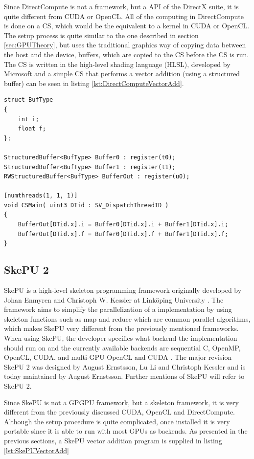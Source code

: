 Since DirectCompute is not a framework, but a API of the DirectX suite, it is quite different from CUDA or OpenCL. All of the computing in DirectCompute is done on a CS, which would be the equivalent to a kernel in CUDA or OpenCL. The setup process is quite similar to the one described in section \ref{sec:GPUTheory}, but uses the traditional graphics way of copying data between the host and the device, buffers, which are copied to the CS before the CS is run. The CS is written in the high-level shading language (HLSL), developed by Microsoft and a simple CS that performs a vector addition (using a structured buffer) can be seen in listing \ref{lst:DirectComputeVectorAdd}.

\begin{lstlisting}[caption={DirectCompute vector addition CS}, label={lst:DirectComputeVectorAdd}, frame=single] 
struct BufType
{
    int i;
    float f; 
};

StructuredBuffer<BufType> Buffer0 : register(t0);
StructuredBuffer<BufType> Buffer1 : register(t1);
RWStructuredBuffer<BufType> BufferOut : register(u0);

[numthreads(1, 1, 1)]
void CSMain( uint3 DTid : SV_DispatchThreadID )
{
    BufferOut[DTid.x].i = Buffer0[DTid.x].i + Buffer1[DTid.x].i;
    BufferOut[DTid.x].f = Buffer0[DTid.x].f + Buffer1[DTid.x].f;
}

\end{lstlisting}



\subsection{SkePU 2}
SkePU is a high-level skeleton programming framework originally developed by Johan Enmyren and Christoph W. Kessler at Linköping University \cite{enmyren2010skepu}. The framework aims to simplify the parallelization of a implementation by using skeleton functions such as map and reduce which are common parallel algorithms, which makes SkePU very different from the previously mentioned frameworks. When using SkePU, the developer specifies what backend the implementation should run on and the currently available backends are sequential C, OpenMP, OpenCL, CUDA, and multi-GPU OpenCL and CUDA \cite{LiUSkePU}. The major revision SkePU 2 was designed by August Ernstsson, Lu Li and Christoph Kessler and is today maintained by August Ernstsson. Further mentions of SkePU will refer to SkePU 2.

Since SkePU is not a GPGPU framework, but a skeleton framework, it is very different from the previously discussed CUDA, OpenCL and DirectCompute. Although the setup procedure is quite complicated, once installed it is very portable since it is able to run with most GPUs as backends. As presented in the previous sections, a SkePU vector addition program is supplied in listing \ref{lst:SkePUVectorAdd}


